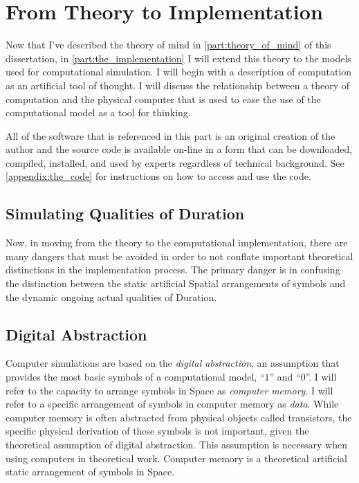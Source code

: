\chapter{From Theory to Implementation}
\label{chapter:from_theory_to_implementation}

Now that I've described the theory of mind in
\autoref{part:theory_of_mind} of this dissertation, in
\autoref{part:the_implementation} I will extend this theory to the
models used for computational simulation.  I will begin with a
description of computation as an artificial tool of thought.  I will
discuss the relationship between a theory of computation and the
physical computer that is used to ease the use of the computational
model as a tool for thinking.

All of the software that is referenced in this part is an original
creation of the author and the source code is available on-line in a
form that can be downloaded, compiled, installed, and used by experts
regardless of technical background.  See \autoref{appendix:the_code}
for instructions on how to access and use the code.

\section{Simulating Qualities of Duration}

Now, in moving from the theory to the computational implementation,
there are many dangers that must be avoided in order to not conflate
important theoretical distinctions in the implementation process.  The
primary danger is in confusing the distinction between the static
artificial Spatial arrangements of symbols and the dynamic ongoing
actual qualities of Duration.

\section{Digital Abstraction}

Computer simulations are based on the \emph{digital abstraction}, an
assumption that provides the most basic symbols of a computational
model, ``$1$'' and ``$0$''.  I will refer to the capacity to arrange
symbols in Space as \emph{computer memory}.  I will refer to a
specific arrangement of symbols in computer memory as \emph{data}.
While computer memory is often abstracted from physical objects called
transistors, the specific physical derivation of these symbols is not
important, given the theoretical assumption of digital abstraction.
This assumption is necessary when using computers in theoretical work.
Computer memory is a theoretical artificial static arrangement of
symbols in Space.

